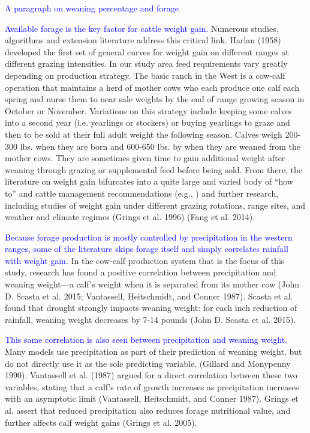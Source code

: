 \documentclass[11pt]{article}
\begin{document}
\textcolor{blue}{A paragraph on weaning percentage and forage}

\textcolor{blue}{Available forage is the key factor for cattle weight gain.} Numerous studies, algorithms and extension literature address this critical link. Harlan (1958) developed the first set of general curves for weight gain on different ranges at different grazing intensities. 
In our study area feed requirements vary greatly depending on production strategy. 
The basic ranch in the West is a cow-calf operation that maintains a herd of mother cows who each produce one calf each spring and nurse them to near sale weights by the end of range growing season in October or November. Variations on this strategy include keeping some calves into a second year (i.e. yearlings or stockers) or buying yearlings to graze and then to be sold at their full adult weight the following season. Calves weigh 200-300 lbs. when they are born and 600-650 lbs. by when they are weaned from the mother cows. They are sometimes given time to gain additional weight after weaning through grazing or supplemental feed before being sold. From there, the literature on weight gain bifurcates into a quite large and varied body of “how to” and cattle management recommendations (e.g.,     ) and further research, including studies of weight gain under different grazing rotations, range sites, and weather and climate regimes (Grings et al. 1996) (Fang et al. 2014). 

\textcolor{blue}{Because forage production is mostly controlled by precipitation in the western ranges, some of the literature skips forage itself and simply correlates rainfall with weight gain.} In the cow-calf production system that is the focus of this study, research has found a positive correlation between precipitation and weaning weight---a calf’s weight when it is separated from its mother cow (John D. Scasta et al. 2015; Vantassell, Heitschmidt, and Conner 1987). Scasta et al. found that drought strongly impacts weaning weight: for each inch reduction of rainfall, weaning weight decreases by 7-14 pounds (John D. Scasta et al. 2015). 

\textcolor{blue}{This same correlation is also seen between precipitation and weaning weight.} 
Many models use precipitation as part of their prediction of weaning weight, but do not directly use it as the sole predicting variable. (Gillard and Monypenny 1990). Vantassell et al. (1987) argued for a direct correlation between these two variables, stating that a calf’s rate of growth increases as precipitation increases with an asymptotic limit (Vantassell, Heitschmidt, and Conner 1987). Grings et al. assert that reduced precipitation also reduces forage nutritional value, and further affects calf weight gains (Grings et al. 2005). 
\end{document}
